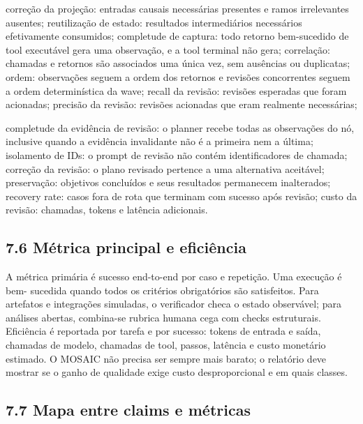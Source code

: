 \documentclass[12pt,a4paper]{article}
\begin{document}
\noindent \textbullet{} correção da projeção: entradas causais necessárias presentes e ramos irrelevantes ausentes; \textbullet{} reutilização de estado: resultados intermediários necessários efetivamente consumidos; \textbullet{} completude de captura: todo retorno bem-sucedido de tool executável gera uma observação, e a tool terminal não gera; \textbullet{} correlação: chamadas e retornos são associados uma única vez, sem ausências ou duplicatas; \textbullet{} ordem: observações seguem a ordem dos retornos e revisões concorrentes seguem a ordem determinística da wave; \textbullet{} recall da revisão: revisões esperadas que foram acionadas; \textbullet{} precisão da revisão: revisões acionadas que eram realmente necessárias;\par


\noindent \textbullet{} completude da evidência de revisão: o planner recebe todas as observações do nó, inclusive quando a evidência invalidante não é a primeira nem a última; \textbullet{} isolamento de IDs: o prompt de revisão não contém identificadores de chamada; \textbullet{} correção da revisão: o plano revisado pertence a uma alternativa aceitável; \textbullet{} preservação: objetivos concluídos e seus resultados permanecem inalterados; \textbullet{} recovery rate: casos fora de rota que terminam com sucesso após revisão; \textbullet{} custo da revisão: chamadas, tokens e latência adicionais.\par

\subsection*{7.6 Métrica principal e eficiência}

A métrica primária é sucesso end-to-end por caso e repetição. Uma execução é bem- sucedida quando todos os critérios obrigatórios são satisfeitos. Para artefatos e integrações simuladas, o verificador checa o estado observável; para análises abertas, combina-se rubrica humana cega com checks estruturais. Eficiência é reportada por tarefa e por sucesso: tokens de entrada e saída, chamadas de modelo, chamadas de tool, passos, latência e custo monetário estimado. O MOSAIC não precisa ser sempre mais barato; o relatório deve mostrar se o ganho de qualidade exige custo desproporcional e em quais classes.


\subsection*{7.7 Mapa entre claims e métricas}
\end{document}
